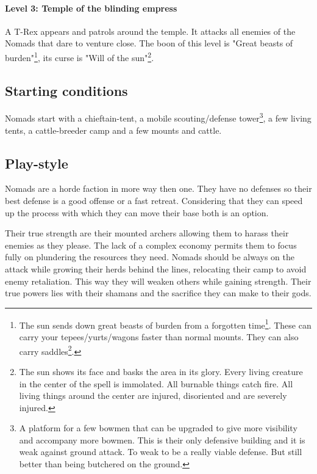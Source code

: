 \documentclass[a4paper]{article}
\begin{document}
			\paragraph{Level 3: Temple of the blinding empress}
				A T-Rex appears and patrols around the temple.
				It attacks all enemies of the \gls{Nomads} that dare to venture close.
				The boon of this level is "Great beasts of burden"\footnote{
					The sun sends down great beasts of burden from a forgotten time\footnote{
						Large herbivore dinosaurs.
					}.
					These can carry your tepees/yurts/wagons faster than normal mounts.
					They can also carry saddles\footnote{
						This is essentially an upgrade that permits production on the move.
					}.
				},
				its curse is "Will of the sun"\footnote{
					The sun shows its face and basks the area in its glory.
					Every living creature in the center of the spell is immolated.
					All burnable things catch fire.
					All living things around the center are injured, disoriented
					and are severely injured.
				}.

	\subsection{Starting conditions}
		\Gls{Nomads} start with a chieftain-tent, a mobile scouting/defense tower\footnote{
		A platform for a few bowmen that can be upgraded to give more visibility
		and accompany more bowmen.
		This is their only defensive building and it is weak against ground attack.
		To weak to be a really viable defense.
		But still better than being butchered on the ground.
		}, a few living tents, a cattle-breeder camp and a few mounts and cattle.

	\subsection{Play-style}
		\Gls{Nomads} are a horde faction in more way then one.
		They have no defenses so their best defense is a good offense or a fast retreat.
		Considering that they can speed up the process with which they can move
		their base both is an option.

		Their true strength are their mounted archers allowing them to harass their enemies
		as they please.
		The lack of a complex economy permits them to focus fully on plundering
		the resources they need.
		\Gls{Nomads} should be always on the attack while growing their herds behind the lines,
		relocating their camp to avoid enemy retaliation.
		This way they will weaken others while gaining strength.
		Their true powers lies with their shamans and the sacrifice they can make to their gods.
\end{document}
